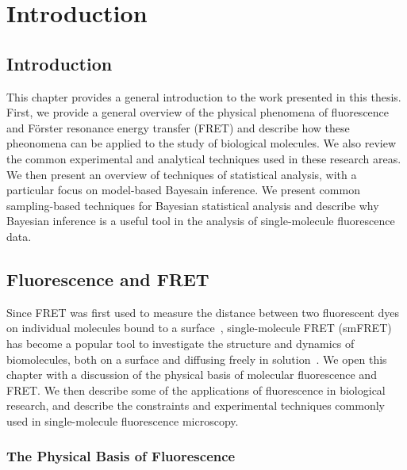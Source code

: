 \chapter{Introduction}
\label{chap:intro}
\section{Introduction}
This chapter provides a general introduction to the work presented in this thesis. First, we provide a general overview of the physical phenomena of fluorescence and F\"{o}rster resonance energy transfer (FRET) and describe how these pheonomena can be applied to the study of biological molecules. We also review the common experimental and analytical techniques used in these research areas. We then present an overview of techniques of statistical analysis, with a particular focus on model-based Bayesain inference. We present common sampling-based techniques for Bayesian statistical analysis and describe why Bayesian inference is a useful tool in the analysis of single-molecule fluorescence data.

\section{Fluorescence and FRET}
Since FRET was first used to measure the distance between two fluorescent dyes on individual molecules bound to a surface~\cite{ha96}, single-molecule FRET (smFRET) has become a popular tool to investigate the structure and dynamics of biomolecules, both on a surface and diffusing freely in solution~\cite{haran03, schuler02, weiss00}. We open this chapter with a discussion of the physical basis of molecular fluorescence and FRET. We then describe some of the applications of fluorescence in biological research, and describe the constraints and experimental techniques commonly used in single-molecule fluorescence microscopy.

\subsection{The Physical Basis of Fluorescence}
